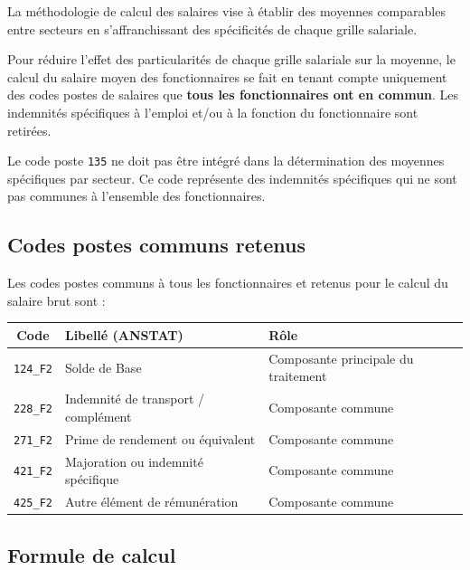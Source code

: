 \documentclass[12pt,a4paper,french]{article}
\newcommand{\code}[1]{\texttt{#1}}
\begin{document}
La méthodologie de calcul des salaires vise à établir des moyennes comparables
entre secteurs en s'affranchissant des spécificités de chaque grille salariale.

\begin{infobox}
    Pour réduire l'effet des particularités de chaque grille salariale sur la
    moyenne, le calcul du salaire moyen des fonctionnaires se fait en tenant
    compte uniquement des codes postes de salaires que \textbf{tous les
    fonctionnaires ont en commun}. Les indemnités spécifiques à l'emploi et/ou
    à la fonction du fonctionnaire sont retirées.
\end{infobox}

\begin{warningbox}
    Le code poste \texttt{135} ne doit pas être intégré dans la détermination
    des moyennes spécifiques par secteur. Ce code représente des indemnités
    spécifiques qui ne sont pas communes à l'ensemble des fonctionnaires.
\end{warningbox}

\subsection{Codes postes communs retenus}

Les codes postes communs à tous les fonctionnaires et retenus pour le calcul
du salaire brut sont :

\begin{center}
\begin{tabular}{cll}
    \toprule
    \textbf{Code} & \textbf{Libellé (ANSTAT)} & \textbf{Rôle} \\
    \midrule
    \code{124\_F2} & Solde de Base & Composante principale du traitement \\
    \code{228\_F2} & Indemnité de transport / complément & Composante commune \\
    \code{271\_F2} & Prime de rendement ou équivalent & Composante commune \\
    \code{421\_F2} & Majoration ou indemnité spécifique & Composante commune \\
    \code{425\_F2} & Autre élément de rémunération & Composante commune \\
    \bottomrule
\end{tabular}
\end{center}

\subsection{Formule de calcul}
\end{document}
